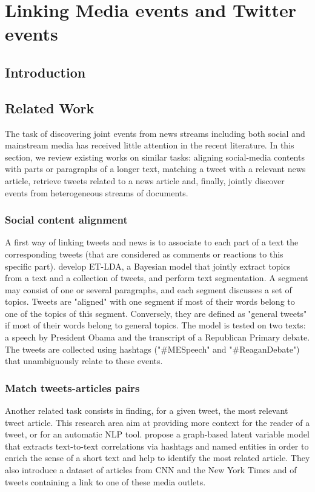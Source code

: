 \chapter{Linking Media events and Twitter events}
\section{Introduction}
\section{Related Work}

The task of discovering joint events from news streams including both social and mainstream media has received little attention in the recent literature. In this section, we review existing works on similar tasks: aligning social-media contents with parts or paragraphs of a longer text, matching a tweet with a relevant news article, retrieve tweets related to a news article and, finally, jointly discover events from heterogeneous streams of documents.

\subsection{Social content alignment}
\label{Social content alignment}
A first way of linking tweets and news is to associate to each part of a text the corresponding tweets (that are considered as comments or reactions to this specific part). \cite{hu_et-lda:_2012} develop ET-LDA, a Bayesian model that jointly extract topics from a text and a collection of tweets, and perform text segmentation. A segment may consist of one or several paragraphs, and each segment discusses a set of topics. Tweets are "aligned" with one segment if most of their words belong to one of the topics of this segment. Conversely, they are defined as "general tweets" if most of their words belong to general topics. The model is tested on two texts: a speech by President Obama and the transcript of a Republican Primary debate. The tweets are collected using hashtags ("\#MESpeech" and "\#ReaganDebate") that unambiguously relate to these events. 

\cite{hou2017learning}
\subsection{Match tweets-articles pairs}
\label{Match tweets-articles pairs}
Another related task consists in finding, for a given tweet, the most relevant tweet article. This research area aim at providing more context for the reader of a tweet, or for an automatic NLP tool. \cite{guo_linking_2013} propose a graph-based latent variable model that extracts text-to-text correlations via hashtags and named entities in order to enrich the sense of a short text and help to identify the most related article. They also introduce a dataset of articles from CNN and the New York Times and of tweets containing a link to one of these media outlets.

